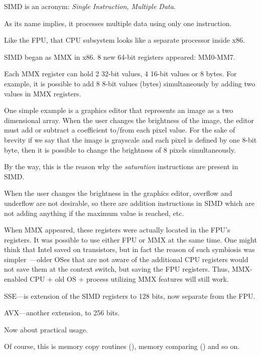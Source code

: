 
\label{SIMD_x86}
\ac{SIMD} is an acronym: \emph{Single Instruction, Multiple Data}.

As its name implies, it processes multiple data using only one instruction.

Like the \ac{FPU}, that \ac{CPU} subsystem looks like a separate processor inside x86.


SIMD began as MMX in x86. 8 new 64-bit registers appeared: MM0-MM7.

Each MMX register can hold 2 32-bit values, 4 16-bit values or 8 bytes.
For example, it is possible to add 8 8-bit values (bytes) simultaneously by adding two values in MMX registers.

One simple example is a graphics editor that represents an image as a two dimensional array.
When the user changes the brightness of the image, the editor must add or subtract a coefficient to/from each pixel value.
For the sake of brevity if we say that the image is grayscale and each pixel is defined by one 8-bit byte, then it is possible
to change the brightness of 8 pixels simultaneously.

By the way, this is the reason why the \emph{saturation} instructions are present in SIMD.

When the user changes the brightness in the graphics editor, overflow and underflow are not desirable, 
so there are addition instructions in SIMD which are not adding anything if the maximum value is reached, etc.

When MMX appeared, these registers were actually located in the FPU's registers. 
It was possible to use either FPU or MMX at the same time. One might think that Intel saved on transistors,
but in fact the reason of such symbiosis was simpler~---older \ac{OS}es that are not aware 
of the additional CPU registers would not save them at the context switch, 
but saving the FPU registers.
Thus, MMX-enabled CPU + old \ac{OS} + process utilizing MMX features will still work.

SSE---is extension of the SIMD registers to 128 bits, now separate from the FPU.

AVX---another extension, to 256 bits.

Now about practical usage.

Of course, this is memory copy routines (), memory comparing () and so on.

